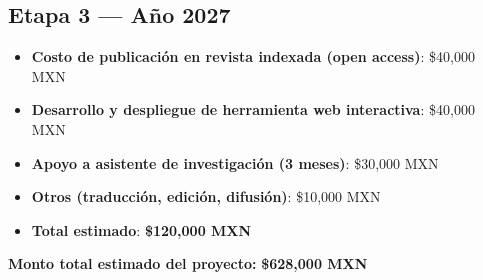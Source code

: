 \documentclass[12pt]{article}
\begin{document}
\subsection*{Etapa 3 — Año 2027}
\begin{itemize}
  \item \textbf{Costo de publicación en revista indexada (open access)}: \$40,000 MXN
  \item \textbf{Desarrollo y despliegue de herramienta web interactiva}: \$40,000 MXN
  \item \textbf{Apoyo a asistente de investigación (3 meses)}: \$30,000 MXN
  \item \textbf{Otros (traducción, edición, difusión)}: \$10,000 MXN
  \item \textbf{Total estimado}: \textbf{\$120,000 MXN}
\end{itemize}

\textbf{Monto total estimado del proyecto:} \textbf{\$628,000 MXN}
\end{document}
